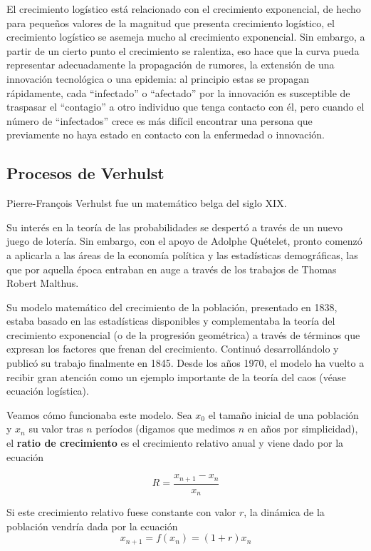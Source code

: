 El crecimiento logístico está relacionado con el crecimiento exponencial, de hecho para pequeños valores de la magnitud que presenta crecimiento logístico, el crecimiento logístico se asemeja mucho al crecimiento exponencial. Sin embargo, a partir de un cierto punto el crecimiento se ralentiza, eso hace que la curva pueda representar adecuadamente la propagación de rumores, la extensión de una innovación tecnológica o una epidemia: al principio estas se propagan rápidamente, cada ``infectado'' o ``afectado'' por la innovación es susceptible de traspasar el ``contagio'' a otro individuo que tenga contacto con él, pero cuando el número de ``infectados'' crece es más difícil encontrar una persona que previamente no haya estado en contacto con la enfermedad o innovación.

\subsection{Procesos de Verhulst}
\begin{definition}
Pierre-François Verhulst fue un matemático belga del siglo XIX.

Su interés en la teoría de las probabilidades se despertó a través de un nuevo juego de lotería. Sin embargo, con el apoyo de Adolphe Quételet, pronto comenzó a aplicarla a las áreas de la economía política y las estadísticas demográficas, las que por aquella época entraban en auge a través de los trabajos de Thomas Robert Malthus.

Su modelo matemático del crecimiento de la población, presentado en 1838, estaba basado en las estadísticas disponibles y complementaba la teoría del crecimiento exponencial (o de la progresión geométrica) a través de términos que expresan los factores que frenan del crecimiento. Continuó desarrollándolo y publicó su trabajo finalmente en 1845. Desde los años 1970, el modelo ha vuelto a recibir gran atención como un ejemplo importante de la teoría del caos (véase ecuación logística).
\end{definition}

Veamos cómo funcionaba este modelo.
\newpage
Sea $x_0$ el tamaño inicial de una población y $x_n$ su valor tras $n$ períodos (digamos que medimos $n$ en años por simplicidad), el \textbf{ratio de crecimiento} es el crecimiento relativo anual y viene dado por la ecuación

\[R=\frac{x_{n+1}-x_n}{x_n} \]

Si este crecimiento relativo fuese constante con valor $r$, la dinámica de la población vendría dada por la ecuación
\[x_{n+1} = f(x_n) = (1+r)x_n\]

